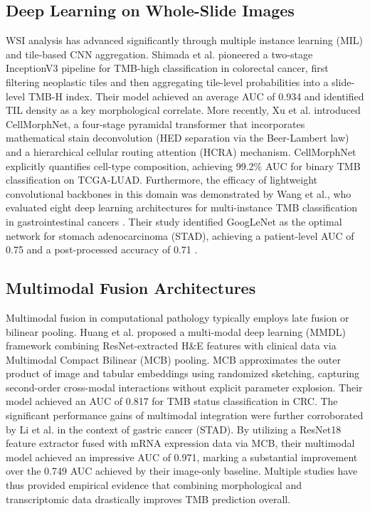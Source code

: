 \documentclass[11pt,a4paper]{article}
\begin{document}
\subsection{Deep Learning on Whole-Slide Images}
WSI analysis has advanced significantly through multiple instance learning (MIL) and tile-based CNN aggregation. Shimada et al. \cite{shimada2021} pioneered a two-stage InceptionV3 pipeline for TMB-high classification in colorectal cancer, first filtering neoplastic tiles and then aggregating tile-level probabilities into a slide-level TMB-H index. Their model achieved an average AUC of 0.934 and identified TIL density as a key morphological correlate. More recently, Xu et al. \cite{xu2024cellmorphnet} introduced CellMorphNet, a four-stage pyramidal transformer that incorporates mathematical stain deconvolution (HED separation via the Beer-Lambert law) and a hierarchical cellular routing attention (HCRA) mechanism. CellMorphNet explicitly quantifies cell-type composition, achieving 99.2\% AUC for binary TMB classification on TCGA-LUAD. Furthermore, the efficacy of lightweight convolutional backbones in this domain was demonstrated by Wang et al., who evaluated eight deep learning architectures for multi-instance TMB classification in gastrointestinal cancers \cite{wang2020}. Their study identified GoogLeNet as the optimal network for stomach adenocarcinoma (STAD), achieving a patient-level AUC of 0.75 and a post-processed accuracy of 0.71 \cite{wang2020}.

\subsection{Multimodal Fusion Architectures}
Multimodal fusion in computational pathology typically employs late fusion or bilinear pooling. Huang et al. \cite{huang2022} proposed a multi-modal deep learning (MMDL) framework combining ResNet-extracted H\&E features with clinical data via Multimodal Compact Bilinear (MCB) pooling. MCB approximates the outer product of image and tabular embeddings using randomized sketching, capturing second-order cross-modal interactions without explicit parameter explosion. Their model achieved an AUC of 0.817 for TMB status classification in CRC. The significant performance gains of multimodal integration were further corroborated by Li et al. \cite{li2024} in the context of gastric cancer (STAD). By utilizing a ResNet18 feature extractor fused with mRNA expression data via MCB, their multimodal model achieved an impressive AUC of 0.971, marking a substantial improvement over the 0.749 AUC achieved by their image-only baseline. Multiple studies have thus provided empirical evidence that combining morphological and transcriptomic data drastically improves TMB prediction overall.
\end{document}
